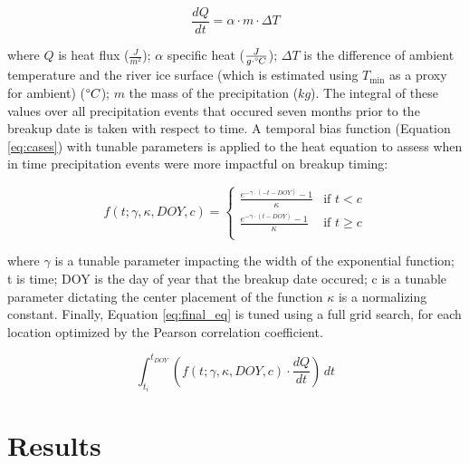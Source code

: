 \documentclass[draft]{AR_analysis_}
\begin{document}
\begin{equation}
\frac{dQ}{dt} = \alpha \cdot m \cdot \Delta T 
	\label{eq:heat_transport}
\end{equation}

\noindent where $Q$ is heat flux ($\frac{J}{m^2}$); $\alpha$ specific heat 
($\frac{J}{g \cdot \degree C}$); $\Delta T$ is the difference of 
ambient temperature and the river ice surface (which is estimated 
using $T_{\text{min}}$ as a proxy for ambient) ($\degree C$); $m$ 
the mass of the precipitation ($kg$). The integral of these values
over all precipitation events that occured seven months prior to the
breakup date is taken with respect to time. A temporal bias function
(Equation \ref{eq:cases})
with tunable parameters is applied to the heat equation to assess when in
time precipitation events were more impactful on breakup timing:

\begin{equation}
	\label{eq:cases}
	f(t; \gamma, \kappa, DOY, c) =
	\begin{cases}
    	\frac{e^{-\gamma \cdot (-t - DOY)} - 1}{\kappa} & \text{if }
        	t < c \\
    	\frac{e^{-\gamma \cdot (t - DOY)} - 1}{\kappa} & \text{if }
        	t \geq c \\
	\end{cases}
\end{equation}

\noindent where $\gamma$ is a tunable parameter impacting the width of
the exponential function; t is time; DOY is the day of year
that the breakup date occured; c is a tunable parameter dictating the
center placement of the function $\kappa$ is a normalizing constant.
Finally, Equation \ref{eq:final_eq} is tuned using a full grid search, for each
location optimized by the Pearson correlation coefficient. 

\begin{equation}
\label{eq:final_eq}
	\int_{t_i}^{t_{DOY}} \left(f(t; \gamma, \kappa, DOY, c) \cdot
	\frac{dQ}{dt}\right) \, dt
\end{equation}



\section{Results} 
\end{document}
